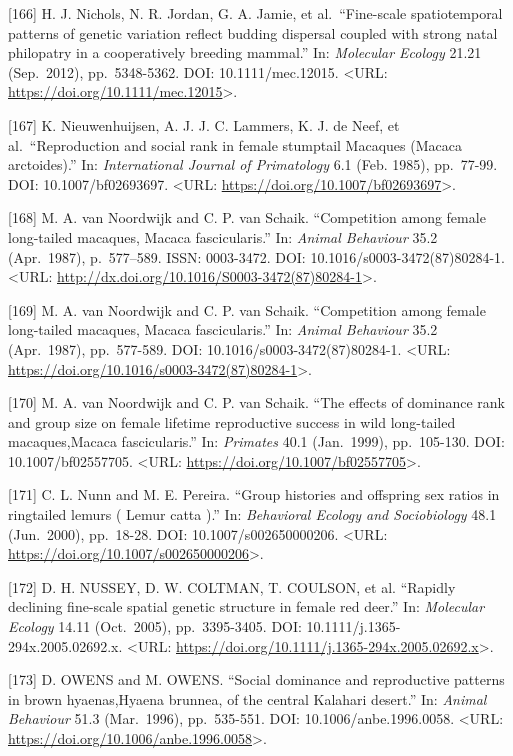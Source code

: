 \documentclass[
]{article}
\begin{document}
{[}166{]} H. J. Nichols, N. R. Jordan, G. A. Jamie, et al.~``Fine-scale
spatiotemporal patterns of genetic variation reflect budding dispersal
coupled with strong natal philopatry in a cooperatively breeding
mammal.'' In: \emph{Molecular Ecology} 21.21 (Sep.~2012), pp.~5348-5362.
DOI: 10.1111/mec.12015. \textless URL:
\url{https://doi.org/10.1111/mec.12015}\textgreater.

{[}167{]} K. Nieuwenhuijsen, A. J. J. C. Lammers, K. J. de Neef, et
al.~``Reproduction and social rank in female stumptail Macaques (Macaca
arctoides).'' In: \emph{International Journal of Primatology} 6.1 (Feb.
1985), pp.~77-99. DOI: 10.1007/bf02693697. \textless URL:
\url{https://doi.org/10.1007/bf02693697}\textgreater.

{[}168{]} M. A. van Noordwijk and C. P. van Schaik. ``Competition among
female long-tailed macaques, Macaca fascicularis.'' In: \emph{Animal
Behaviour} 35.2 (Apr.~1987), p.~577--589. ISSN: 0003-3472. DOI:
10.1016/s0003-3472(87)80284-1. \textless URL:
\url{http://dx.doi.org/10.1016/S0003-3472(87)80284-1}\textgreater.

{[}169{]} M. A. van Noordwijk and C. P. van Schaik. ``Competition among
female long-tailed macaques, Macaca fascicularis.'' In: \emph{Animal
Behaviour} 35.2 (Apr.~1987), pp.~577-589. DOI:
10.1016/s0003-3472(87)80284-1. \textless URL:
\url{https://doi.org/10.1016/s0003-3472(87)80284-1}\textgreater.

{[}170{]} M. A. van Noordwijk and C. P. van Schaik. ``The effects of
dominance rank and group size on female lifetime reproductive success in
wild long-tailed macaques,Macaca fascicularis.'' In: \emph{Primates}
40.1 (Jan.~1999), pp.~105-130. DOI: 10.1007/bf02557705. \textless URL:
\url{https://doi.org/10.1007/bf02557705}\textgreater.

{[}171{]} C. L. Nunn and M. E. Pereira. ``Group histories and offspring
sex ratios in ringtailed lemurs ( Lemur catta ).'' In: \emph{Behavioral
Ecology and Sociobiology} 48.1 (Jun.~2000), pp.~18-28. DOI:
10.1007/s002650000206. \textless URL:
\url{https://doi.org/10.1007/s002650000206}\textgreater.

{[}172{]} D. H. NUSSEY, D. W. COLTMAN, T. COULSON, et al. ``Rapidly
declining fine-scale spatial genetic structure in female red deer.'' In:
\emph{Molecular Ecology} 14.11 (Oct.~2005), pp.~3395-3405. DOI:
10.1111/j.1365-294x.2005.02692.x. \textless URL:
\url{https://doi.org/10.1111/j.1365-294x.2005.02692.x}\textgreater.

{[}173{]} D. OWENS and M. OWENS. ``Social dominance and reproductive
patterns in brown hyaenas,Hyaena brunnea, of the central Kalahari
desert.'' In: \emph{Animal Behaviour} 51.3 (Mar.~1996), pp.~535-551.
DOI: 10.1006/anbe.1996.0058. \textless URL:
\url{https://doi.org/10.1006/anbe.1996.0058}\textgreater.
\end{document}
